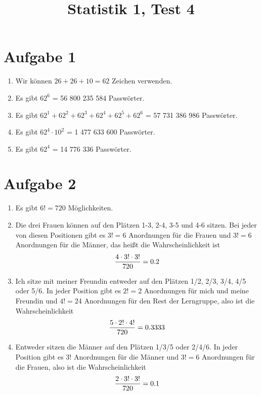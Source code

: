 \documentclass{article}
\title{\textbf{Statistik 1, Test 4}}
\date{}
\begin{document}
	\maketitle
	
	\section*{Aufgabe 1}
	\begin{enumerate}[label=(\alph*)]
		\item Wir können $26 + 26 + 10 = 62$ Zeichen verwenden.
		\item Es gibt $62^6$ = 56 800 235 584 Passwörter.
		\item Es gibt $62^1 + 62^2 + 62^3 + 62^4 + 62^5 + 62^6$ = 57 731 386 986 Passwörter.
		\item Es gibt $62^4\cdot 10^2$ = 1 477 633 600 Passwörter.
		\item Es gibt $62^4$ = 14 776 336 Passwörter.
	\end{enumerate}

	\section*{Aufgabe 2}
	\begin{enumerate}[label=(\alph*)]
		\item Es gibt $6! = 720$ Möglichkeiten.
		\item Die drei Frauen können auf den Plätzen 1-3, 2-4, 3-5 und 4-6 sitzen. Bei jeder von diesen Positionen gibt es $3!=6$ Anordnungen für die Frauen und $3!=6$ Anordnungen für die Männer, das heißt die Wahrscheinlichkeit ist
		\begin{align}
			\frac{4\cdot 3!\cdot 3!}{720} = 0.2 \notag
		\end{align}
		\item Ich sitze mit meiner Freundin entweder auf den Plätzen 1/2, 2/3, 3/4, 4/5 oder 5/6. In jeder Position gibt es $2!=2$ Anordnungen für mich und meine Freundin und $4!=24$ Anordnungen für den Rest der Lerngruppe, also ist die Wahrscheinlichkeit
		\begin{align}
			\frac{5\cdot 2!\cdot 4!}{720} = 0.3333 \notag
		\end{align}
		\item Entweder sitzen die Männer auf den Plätzen 1/3/5 oder 2/4/6. In jeder Position gibt es $3!$ Anordnungen für die Männer und $3!=6$ Anordnungen für die Frauen, also ist die Wahrscheinlichkeit
		\begin{align}
			\frac{2\cdot 3!\cdot 3!}{720} = 0.1 \notag
		\end{align}
	\end{enumerate}
\end{document}
